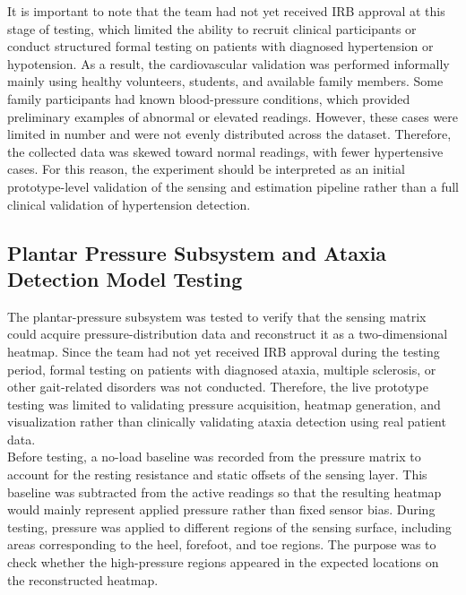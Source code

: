 \noindent It is important to note that the team had not yet received IRB approval at this stage of testing, which limited the ability to recruit clinical participants or conduct structured formal testing on patients with diagnosed hypertension or hypotension. As a result, the cardiovascular validation was performed informally mainly using healthy volunteers, students, and available family members. Some family participants had known blood-pressure conditions, which provided preliminary examples of abnormal or elevated readings. However, these cases were limited in number and were not evenly distributed across the dataset. Therefore, the collected data was skewed toward normal readings, with fewer hypertensive cases. For this reason, the experiment should be interpreted as an initial prototype-level validation of the sensing and estimation pipeline rather than a full clinical validation of hypertension detection. \\




\subsection{Plantar Pressure Subsystem and Ataxia Detection Model Testing}
\label{subsec:plantar_pressure_testing_setup}

\noindent The plantar-pressure subsystem was tested to verify that the sensing matrix could acquire pressure-distribution data and reconstruct it as a two-dimensional heatmap. Since the team had not yet received IRB approval during the testing period, formal testing on patients with diagnosed ataxia, multiple sclerosis, or other gait-related disorders was not conducted. Therefore, the live prototype testing was limited to validating pressure acquisition, heatmap generation, and visualization rather than clinically validating ataxia detection using real patient data. \\

\noindent Before testing, a no-load baseline was recorded from the pressure matrix to account for the resting resistance and static offsets of the sensing layer. This baseline was subtracted from the active readings so that the resulting heatmap would mainly represent applied pressure rather than fixed sensor bias. During testing, pressure was applied to different regions of the sensing surface, including areas corresponding to the heel, forefoot, and toe regions. The purpose was to check whether the high-pressure regions appeared in the expected locations on the reconstructed heatmap. \\

